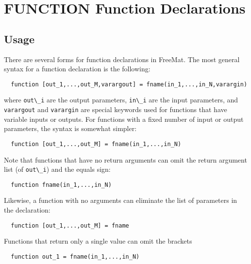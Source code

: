 \section{FUNCTION Function Declarations}

\subsection{Usage}

There are several forms for function declarations in FreeMat.
The most general syntax for a function declaration is the
following:
\begin{verbatim}
  function [out_1,...,out_M,varargout] = fname(in_1,...,in_N,varargin)
\end{verbatim}
where \verb|out\_i| are the output parameters, \verb|in\_i| are the input
parameters, and \verb|varargout| and \verb|varargin| are special keywords
used for functions that have variable inputs or outputs.  For
functions with a fixed number of input or output parameters, the
syntax is somewhat simpler:
\begin{verbatim}
  function [out_1,...,out_M] = fname(in_1,...,in_N)
\end{verbatim}
Note that functions that have no return arguments can omit
the return argument list (of \verb|out\_i|) and the equals sign:
\begin{verbatim}
  function fname(in_1,...,in_N)
\end{verbatim}
Likewise, a function with no arguments can eliminate the list
of parameters in the declaration:
\begin{verbatim}
  function [out_1,...,out_M] = fname
\end{verbatim}
Functions that return only a single value can omit the brackets
\begin{verbatim}
  function out_1 = fname(in_1,...,in_N)
\end{verbatim}

